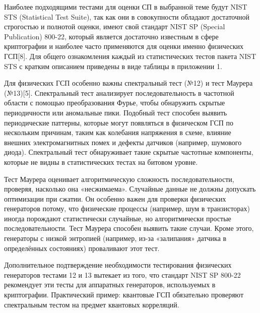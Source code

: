 Наиболее подходящими тестами для оценки СП в выбранной теме будут NIST
STS (Statistical Test Suite), так как они в совокупности обладают
достаточной строгостью и полнотой оценки, имеют свой стандарт NIST SP
(Special Publication) 800-22, который является достаточно известным в
сфере криптографии и наиболее часто применяются для оценки именно
физических ГСП{[}8{]}. Для общего ознакомления каждый из статистических
тестов пакета NIST STS с кратким описанием приведены в виде таблицы в
приложении 1.

Для физических ГСП особенно важны спектральный тест (№12) и тест Маурера
(№13){[}5{]}. Спектральный тест анализирует последовательность в
частотной области с помощью преобразования Фурье, чтобы обнаружить
скрытые периодичности или аномальные пики. Подобный тест способен
выявить периодические паттерны, которые могут появляться в физическом
ГСП по нескольким причинам, таким как колебания напряжения в схеме,
влияние внешних электромагнитных помех и дефекты датчиков (например,
шумового диода). Спектральный тест обнаруживает такие скрытые частотные
компоненты, которые не видны в статистических тестах на битовом уровне.

Тест Маурера оценивает алгоритмическую сложность последовательности,
проверяя, насколько она «несжимаема». Случайные данные не должны
допускать оптимизации при сжатии. Он особенно важен для проверки
физических генераторов потому, что физические процессы (например, шум в
транзисторах) иногда порождают статистически случайные, но
алгоритмически простые последовательности. Тест Маурера способен выявить
такие случаи. Кроме этого, генераторы с низкой энтропией (например,
из-за «залипания» датчика в определённых состояниях) проваливают этот
тест.

Дополнительное подтверждение необходимости тестирования физических
генераторов тестами 12 и 13 вытекает из того, что стандарт NIST SP
800-22 рекомендует эти тесты для аппаратных генераторов, используемых в
криптографии. Практический пример: квантовые ГСП обязательно проверяют
спектральным тестом на предмет квантовых корреляций.

